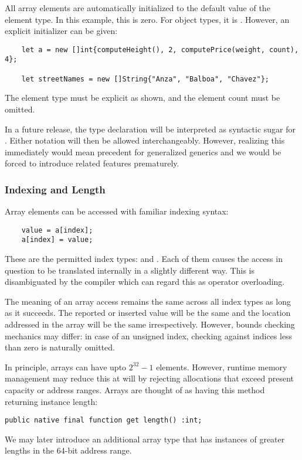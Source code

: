 All array elements are automatically initialized to the default value of the
element type. In this example, this is zero. For object types, it is
. However, an explicit initializer can be given:
\begin{verbatim}
    let a = new []int{computeHeight(), 2, computePrice(weight, count), 4};

    let streetNames = new []String{"Anza", "Balboa", "Chavez"};
\end{verbatim}
The element type must be explicit as shown, and the element count must be
omitted.

In a future release, the type declaration  will be interpreted as
syntactic sugar for . Either notation will then be allowed
interchangeably. However, realizing this immediately would mean precedent
for generalized generics and we would be forced to introduce related features
prematurely.

\subsubsection{Indexing and Length}
\label{arrayIndexLength}
Array elements can be accessed with familiar indexing syntax:
\begin{verbatim}
    value = a[index];
    a[index] = value;
\end{verbatim}
These are the permitted index types:  and . Each
of them causes the access in question to be translated internally in a slightly different way.
This is disambiguated by the compiler which can regard this as operator
overloading.

The meaning of an array access remains the same across all index types as long
as it succeeds. The reported or inserted value will be the same and the location
addressed in the array will be the same irrespectively. However, bounds checking
mechanics may differ: in case of an unsigned index, checking against indices less than zero is
naturally omitted.

In principle, arrays can have upto $2^{32}-1$ elements. However, runtime memory
management may reduce this at will by rejecting allocations that exceed present
capacity or address ranges. Arrays are thought of as having this method
returning instance length:
\begin{verbatim}
public native final function get length() :int;
\end{verbatim}
We may later introduce an additional array type that has instances of greater
lengths in the 64-bit address range.

